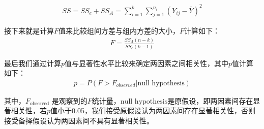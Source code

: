 \documentclass{cumcmthesis}
\begin{document}
\begin{eqnarray}
SS=SS_e+SS_A=\sum_{i=1}^k\sum_{j=1}^{n_i}(Y_{ij}-\bar{Y})^2
\end{eqnarray}

接下来就是计算$F$值来比较组间方差与组内方差的大小，$F$计算如下：
\begin{eqnarray}
F=\frac{SS_A(n-k)}{SS_e(k-1)}
\end{eqnarray}

最后我们通过计算$p$值与显著性水平比较来确定两因素之间相关性，其中$p$值计算如下：
\begin{eqnarray}
p=P(F>F_{observed}|\text{null hypothesis})
\end{eqnarray}

其中，$F_{\text{observed}}$ 是观察到的$F$统计量，$\text{null hypothesis}$是原假设，即两因素间存在显著相关性，若$p$值小于0.05，我们接受原假设认为两因素间存在显著相关性，否则接受备择假设认为两因素间不具有显著相关性。
\end{document}
